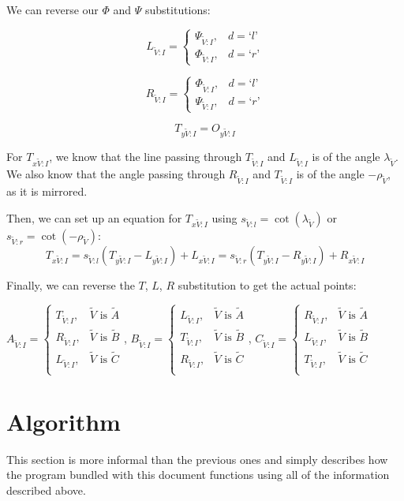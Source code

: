 \documentclass[a4paper,12pt]{article}
\newcommand{\HSindexpart}[1]{\text{`}#1\text{'}}
\newcommand{\HSview}[1][V]{\widetilde{#1}}
\newcommand{\HSA}[1][I]{A_{\HSview:#1}}
\newcommand{\HSB}[1][I]{B_{\HSview:#1}}
\newcommand{\HSC}[1][I]{C_{\HSview:#1}}
\newcommand{\HST}[1][I]{T_{\HSview:#1}}
\newcommand{\HSL}[1][I]{L_{\HSview:#1}}
\newcommand{\HSR}[1][I]{R_{\HSview:#1}}
\newcommand{\HSTx}[1][I]{T_{x\HSview:#1}}
\newcommand{\HSLx}[1][I]{L_{x\HSview:#1}}
\newcommand{\HSRx}[1][I]{R_{x\HSview:#1}}
\newcommand{\HSTy}[1][I]{T_{y\HSview:#1}}
\newcommand{\HSLy}[1][I]{L_{y\HSview:#1}}
\newcommand{\HSRy}[1][I]{R_{y\HSview:#1}}
\newcommand{\HSPSI}[1][I]{\Psi_{\HSview:#1}}
\newcommand{\HSPHI}[1][I]{\Phi_{\HSview:#1}}
\newcommand{\HSOy}[1][I]{O_{y\HSview:#1}}
\newcommand{\HSlambda}{\lambda_{\HSview}}
\newcommand{\HSrho}{\rho_{\HSview}}
\newcommand{\HSs}[1][d]{s_{\HSview:#1}}
\theoremstyle{definition}
\theoremstyle{plain}
\begin{document}
	We can reverse our $\Phi$ and $\Psi$ substitutions:

	$$\HSL = \begin{cases}
		\HSPSI, & d = \HSindexpart{l}\\
		\HSPHI, & d = \HSindexpart{r}
	\end{cases}$$

	$$\HSR = \begin{cases}
		\HSPHI, & d = \HSindexpart{l}\\
		\HSPSI, & d = \HSindexpart{r}
	\end{cases}$$

	$$\HSTy = \HSOy$$

	For $\HSTx$, we know that the line passing through
	$\HST$ and $\HSL$ is of the angle $\HSlambda$.
	We also know that the angle passing through $\HSR$ and $\HST$ is of the angle $-\HSrho$, as it is mirrored.

	Then, we can set up an equation for $\HSTx$ using $\HSs[l] = \cot\left(\HSlambda\right)$ or $\HSs[r] = \cot\left(-\HSrho\right)$:
	$$\HSTx = \HSs[l]\left(\HSTy - \HSLy\right) + \HSLx = \HSs[r]\left(\HSTy - \HSRy\right) + \HSRx$$
	
	Finally, we can reverse the $T$, $L$, $R$ substitution to get the actual points:
	
	$\HSA = \begin{cases}
		\HST, & \HSview \text{ is } \HSview[A]\\
		\HSR, & \HSview \text{ is } \HSview[B]\\
		\HSL, & \HSview \text{ is } \HSview[C]\\
  \end{cases}$,\quad\quad
	$\HSB = \begin{cases}
		\HSL, & \HSview \text{ is } \HSview[A]\\
		\HST, & \HSview \text{ is } \HSview[B]\\
		\HSR, & \HSview \text{ is } \HSview[C]\\
  \end{cases}$,\quad\quad
	$\HSC = \begin{cases}
		\HSR, & \HSview \text{ is } \HSview[A]\\
		\HSL, & \HSview \text{ is } \HSview[B]\\
		\HST, & \HSview \text{ is } \HSview[C]\\
  \end{cases}$

	\newpage
	\section{Algorithm}
	This section is more informal than the previous ones and simply describes how the program bundled with this document
	functions using all of the information described above.
	
\end{document}
